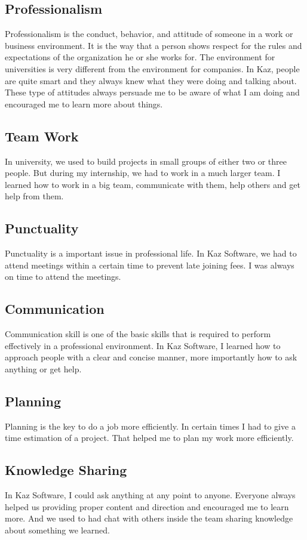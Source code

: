 \subsection{Professionalism}

Professionalism is the conduct, behavior, and attitude of someone in a work or business environment.
It is the way that a person shows respect for the rules and expectations of the organization he or she works for.
The environment for universities is very different from the environment for companies.
In Kaz, people are quite smart and they always knew what they were doing and talking about.
These type of attitudes always persuade me to be aware of what I am doing and encouraged me to learn  more about things.

\subsection{Team Work}

In university, we used to build projects in small groups of either two or three people.
But during my internship, we had to work in a much larger team.
I learned how to work in a big team, communicate with them, help others and get help from them.

\subsection{Punctuality}

Punctuality is a important issue in professional life.
In Kaz Software, we had to attend meetings within a certain time to prevent late joining fees.
I was always on time to attend the meetings.

\subsection{Communication}

Communication skill is one of the basic skills that is required to perform effectively in a professional environment.
In Kaz Software, I learned how to approach people with a clear and concise manner, more importantly how to ask anything or get help.

\subsection{Planning}

Planning is the key to do a job more efficiently.
In certain times I had to give a time estimation of a project.
That helped me to plan my work more efficiently.

\subsection{Knowledge Sharing}

In Kaz Software, I could ask anything at any point to anyone.
Everyone always helped us providing proper content and direction and encouraged me to learn more.
And we used to had chat with others inside the team sharing knowledge about something we learned.

